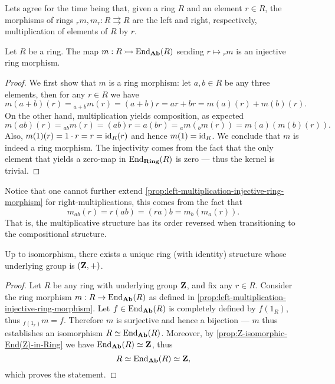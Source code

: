 Lets agree for the time being that, given a ring \(R\) and an element
\(r \in R\), the morphisms of rings \({}_rm, m_r: R \rightrightarrows R\) are
the left and right, respectively, multiplication of elements of \(R\) by \(r\).

%
\begin{proposition}
\label{prop:left-multiplication-injective-ring-morphism}
Let \(R\) be a ring. The map \(m: R \rightarrowtail \operatorname{End}_{{\textbf{Ab}}}(R)\) sending
\(r \mapsto {}_rm\) is an injective ring morphism.
\end{proposition}
%

%
\begin{proof}
We first show that \(m\) is a ring morphism: let \(a, b \in R\) be any three
elements, then for any \(r \in R\) we have
\[
m(a + b)(r) = {}_{a + b}m(r) = (a + b)r = a r + b r = m(a)(r) + m(b)(r).
\]
On the other hand, multiplication yields composition, as expected
\[
m(a b)(r) = {}_{a b}m(r) = (a b) r = a (b r) = {}_am({}_bm(r)) = m(a)(m(b)(r)).
\]
Also, \(m(1)(r) = 1 \cdot r = r = \operatorname{id}_R(r)\) and hence \(m(1) = \operatorname{id}_R\). We
conclude that \(m\) is indeed a ring morphism. The injectivity comes from the
fact that the only element that yields a zero-map in \(\operatorname{End}_{{\textbf{Ring}}}(R)\) is zero
--- thus the kernel is trivial.
\end{proof}
%

%
\begin{remark}
\label{rem:ring-right-multiplication-lacks-conditions}
Notice that one cannot further extend
\cref{prop:left-multiplication-injective-ring-morphism} for
right-multiplications, this comes from the fact that
\[
m_{a b}(r) = r (a b) = (r a) b = m_b(m_a(r)).
\]
That is, the multiplicative structure has its order reversed when transitioning
to the compositional structure.
\end{remark}
%

%
\begin{proposition}
\label{prop:unique-ring-structure-Z}
Up to isomorphism, there exists a unique ring (with identity) structure whose
underlying group is \((\mathbf{Z}, +)\).
\end{proposition}
%

%
\begin{proof}
Let \(R\) be any ring with underlying group \(\mathbf{Z}\), and fix any \(r \in
R\). Consider the ring morphism \(m: R \to \operatorname{End}_{{\textbf{Ab}}}(R)\) as defined in
\cref{prop:left-multiplication-injective-ring-morphism}. Let
\(f \in \operatorname{End}_{{\textbf{Ab}}}(R)\) is completely defined by \(f(1_R)\), thus
\({}_{f(1_r)}m = f\). Therefore \(m\) is surjective and hence a bijection ---
\(m\) thus establishes an isomorphism \(R \simeq \operatorname{End}_{{\textbf{Ab}}}(R)\). Moreover, by
\cref{prop:Z-isomorphic-End(Z)-in-Ring} we have \(\operatorname{End}_{{\textbf{Ab}}}(R) \simeq \mathbf{Z}\), thus
\[
R \simeq \operatorname{End}_{{\textbf{Ab}}}(R) \simeq \mathbf{Z},
\]
which proves the statement.
\end{proof}
%


